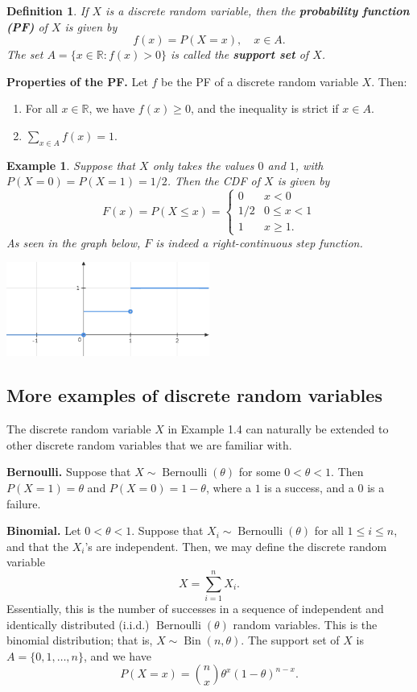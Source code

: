 \documentclass[10pt]{article}
\newcommand{\R}{\mathbb{R}}
\DeclareMathOperator{\Ber}{Bernoulli}
\DeclareMathOperator{\Bin}{Bin}
\theoremstyle{newstyle}
\newtheorem{defn}[thm]{Definition}
\newtheorem{exmp}[thm]{Example}
\begin{document}
\begin{defn}
If $X$ is a discrete random variable, then the {\bf probability function (PF)} of $X$ is given by 
\[ f(x) = P(X = x), \quad x \in A. \] 
The set $A = \{x \in \R : f(x) > 0\}$ is called the {\bf support set} of $X$.
\end{defn}
{\bf Properties of the PF.} Let $f$ be the PF of a discrete random variable $X$. Then: 
\begin{enumerate}[(1)]
    \item For all $x \in \R$, we have $f(x) \geq 0$, and the inequality is strict if $x \in A$. 
    \item $\sum_{x \in A} f(x) = 1$.
\end{enumerate}

\begin{exmp}
Suppose that $X$ only takes the values $0$ and $1$, with $P(X = 0) = P(X = 1) = 1/2$. Then the 
CDF of $X$ is given by 
\[ F(x) = P(X \leq x) = \begin{cases} 0 & x < 0 \\ 1/2 & 0 \leq x < 1 \\ 1 & x \geq 1. \end{cases} \]
As seen in the graph below, $F$ is indeed a right-continuous step function.
\begin{center}
\includegraphics[width=0.5\textwidth]{example1.png}
\end{center}
\end{exmp}

\subsection{More examples of discrete random variables}

The discrete random variable $X$ in Example 1.4 can naturally be extended to other discrete random
variables that we are familiar with. 

{\bf Bernoulli.}
Suppose that $X \sim \Ber(\theta)$ for some $0 < \theta < 1$. Then 
$P(X = 1) = \theta$ and $P(X = 0) = 1-\theta$, where a $1$ is a success, and a $0$ is a failure. 

{\bf Binomial.}
Let $0 < \theta < 1$. Suppose that $X_i \sim \Ber(\theta)$ for all $1 \leq i \leq n$, 
and that the $X_i$'s are independent. 
Then, we may define the discrete random variable
\[ X = \sum_{i=1}^n X_i. \]
Essentially, this is the number of successes in a sequence of independent and identically distributed
(i.i.d.) $\Ber(\theta)$ random variables. This is the binomial distribution; 
that is, $X \sim \Bin(n, \theta)$. The support set of $X$ is $A = \{0, 1, \dots, n\}$, and 
we have 
\[ P(X = x) = \binom{n}{x} \theta^x (1-\theta)^{n-x}. \]
\end{document}
